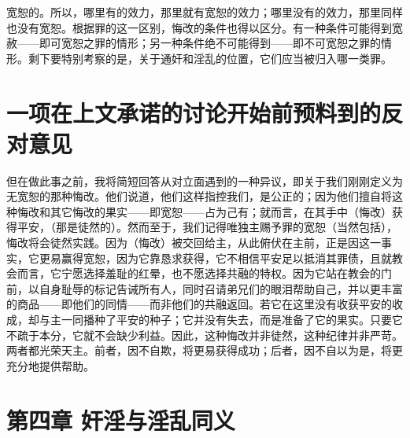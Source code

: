 宽恕的。所以，哪里有的效力，那里就有宽恕的效力；哪里没有的效力，那里同样也没有宽恕。根据罪的这一区别，悔改的条件也得以区分。有一种条件可能得到宽赦——即可宽恕之罪的情形；另一种条件绝不可能得到——即不可宽恕之罪的情形。剩下要特别考察的是，关于通奸和淫乱的位置，它们应当被归入哪一类罪。\par


\section{一项在上文承诺的讨论开始前预料到的反对意见}

但在做此事之前，我将简短回答从对立面遇到的一种异议，即关于我们刚刚定义为无宽恕的那种悔改。他们说道，他们这样指控我们，是公正的；因为他们擅自将这种悔改和其它悔改的果实——即宽恕——占为己有；就而言，在其手中（悔改）获得平安，（那是徒然的）。然而至于，我们记得唯独主赐予罪的宽恕（当然包括），悔改将会徒然实践。因为（悔改）被交回给主，从此俯伏在主前，正是因这一事实，它更易赢得宽恕，因为它靠恳求获得，它不相信平安足以抵消其罪债，且就教会而言，它宁愿选择羞耻的红晕，也不愿选择共融的特权。因为它站在教会的门前，以自身耻辱的标记告诫所有人，同时召请弟兄们的眼泪帮助自己，并以更丰富的商品——即他们的同情——而非他们的共融返回。若它在这里没有收获平安的收成，却与主一同播种了平安的种子；它并没有失去，而是准备了它的果实。只要它不疏于本分，它就不会缺少利益。因此，这种悔改并非徒然，这种纪律并非严苛。两者都光荣天主。前者，因不自欺，将更易获得成功；后者，因不自以为是，将更充分地提供帮助。\par


\section{第四章 奸淫与淫乱同义}

